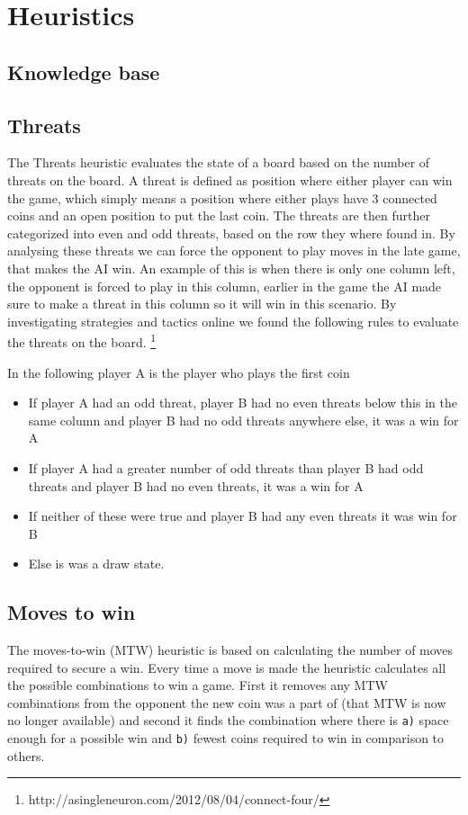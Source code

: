 \documentclass[a4paper, titlepage]{article}
\begin{document}
\section*{Heuristics}
\subsection*{Knowledge base}


\subsection*{Threats}
The Threats heuristic evaluates the state of a board based on the number of threats on 
the board. 
A threat is defined as position where either player can win the game, which simply means a 
position where either plays have 3 connected coins and an open position to put the last coin. 
The threats are then further categorized into even and odd threats, based on the row they 
where found in. By analysing these threats we can force the opponent to play moves in the 
late game, that makes the AI win. An example of this is when there is only one column left, 
the opponent is forced to play in this column, earlier in the game the AI made sure to make a 
threat in this column so it will win in this scenario. By investigating strategies and tactics 
online we found the following rules to evaluate the threats on the board.
\footnote{http://asingleneuron.com/2012/08/04/connect-four/}

In the following player A is the player who plays the first coin
\begin{itemize} 
	\item If player A had an odd threat, player B had no even threats below this in the same column and player B had no odd threats anywhere else, it was a win for A
	\item If player A had a greater number of odd threats than player B had odd threats and player B had no even threats, it was a win for A	
	\item If neither of these were true and player B had any even threats it was win for B
	\item Else is was a draw state.
\end{itemize} 

\subsection*{Moves to win}
The moves-to-win (MTW) heuristic is based on calculating the number of moves required to 
secure a win. Every time a move is made the heuristic calculates all the possible 
combinations to win a game. First it removes any MTW combinations from the opponent
the new coin was a part of (that MTW is now no longer available) and second it finds 
the combination where there is \texttt{a)} space enough for a possible win and 
\texttt{b)} fewest coins required to win in comparison to others.
\end{document}
